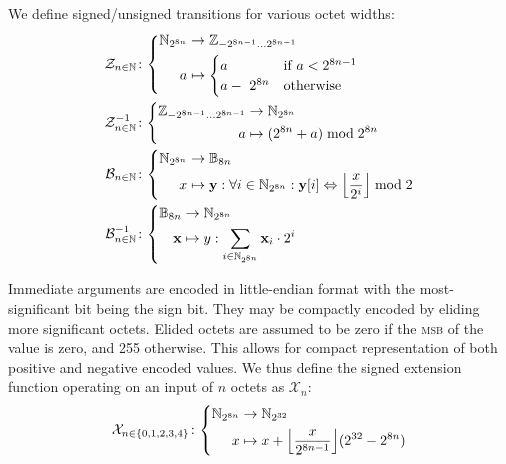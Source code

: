 We define signed/unsigned transitions for various octet widths:
\begin{align}
  \label{eq:signedfunc}
  \signfunc{n \in \N}&\colon\left\{\begin{aligned}
    \N_{2^{8n}} &\to \Z_{-2^{8n-1}\dots2^{8n-1}}\\
    a &\mapsto \begin{cases}
      a &\when a < 2^{8n-1} \\
      a -\ 2^{8n} &\otherwise
    \end{cases}
  \end{aligned}\right.\\
  \unsignfunc{n \in \N}&\colon\left\{\begin{aligned}
    \Z_{-2^{8n-1}\dots2^{8n-1}} &\to \N_{2^{8n}}\\
    a &\mapsto (2^{8n} + a) \bmod 2^{8n}
  \end{aligned}\right.\\
  \label{eq:bitsfunc}
  \bitsfunc{n\in\N}&\colon\left\{\begin{aligned}
    \N_{2^{8n}} &\to \mathbb{B}_{8n}\\
    x &\mapsto \mathbf{y}: \forall i \in \N_{2^{8n}} : \mathbf{y}[i] \Leftrightarrow \ffrac{x}{2^i}\bmod 2
  \end{aligned}\right.\\
  \unbitsfunc{n\in\N}&\colon\left\{\begin{aligned}
    \mathbb{B}_{8n} &\to \N_{2^{8n}}\\
    \mathbf{x} &\mapsto y: \sum_{i \in \N_{2^{8n}}} \mathbf{x}_i \cdot 2^i
  \end{aligned}\right.
\end{align}

\newcommand{\sext}{\mathcal{X}}

Immediate arguments are encoded in little-endian format with the most-significant bit being the sign bit. They may be compactly encoded by eliding more significant octets. Elided octets are assumed to be zero if the \textsc{msb} of the value is zero, and 255 otherwise. This allows for compact representation of both positive and negative encoded values. We thus define the signed extension function operating on an input of $n$ octets as $\sext_n$:
\begin{align}\label{eq:signedextension}
  \sext_{n\in\{0, 1, 2, 3, 4\}}\colon\left\{\begin{aligned}
    \N_{2^{8n}} &\to \N_{2^{32}}\\
    x &\mapsto x + \ffrac{x}{2^{8n-1}}(2^{32}-2^{8n})
  \end{aligned}\right.
\end{align}

